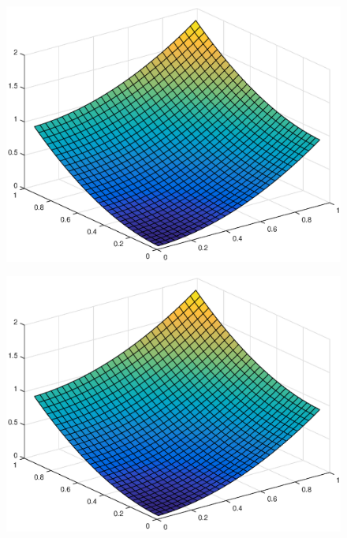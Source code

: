 \documentclass[main.tex]{subfiles}
\begin{document}
\begin{figure}[h]
\centering
\begin{minipage}{.3\textwidth}
  \centering
  \includegraphics[width=.9\linewidth]{../Figures/ex2u1exact}
  \label{fig:ex2:u1exact}
\end{minipage}\hfill%
\begin{minipage}{.3\textwidth}
  \centering
  \includegraphics[width=.9\linewidth]{../Figures/ex2u1calc}
  \label{fig:ex2:u1calc}
\end{minipage}\hfill%
\begin{minipage}{.3\textwidth}
  \centering

\end{minipage}
\end{figure}
\end{document}
